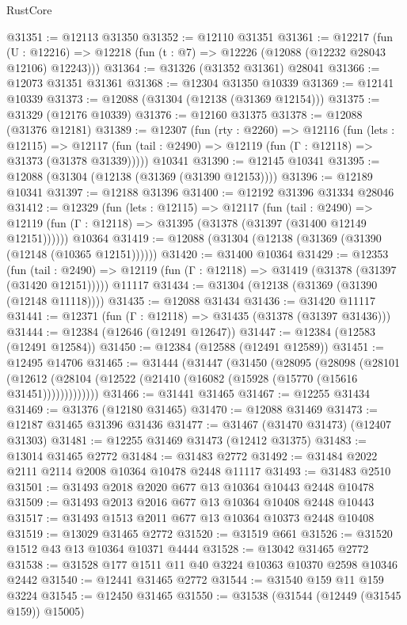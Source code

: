 \begin{lexlean}{RustCore}
\begin{coremodule}
@31351 := @12113 @31350
@31352 := @12110 @31351
@31361 := @12217
    (fun (U : @12216) => @12218 (fun (t : @7) => @12226 (@12088 (@12232 @28043 @12106) @12243)))
@31364 := @31326 (@31352 @31361) @28041
@31366 := @12073 @31351 @31361
@31368 := @12304 @31350 @10339
@31369 := @12141 @10339
@31373 := @12088 (@31304 (@12138 (@31369 @12154)))
@31375 := @31329 (@12176 @10339)
@31376 := @12160 @31375
@31378 := @12088 (@31376 @12181)
@31389 := @12307
    (fun (rty : @2260) =>
    @12116
      (fun (lets : @12115) =>
      @12117 (fun (tail : @2490) => @12119 (fun (Γ : @12118) => @31373 (@31378 @31339)))))
    @10341
@31390 := @12145 @10341
@31395 := @12088 (@31304 (@12138 (@31369 (@31390 @12153))))
@31396 := @12189 @10341
@31397 := @12188 @31396
@31400 := @12192 @31396 @31334 @28046
@31412 := @12329
    (fun (lets : @12115) =>
    @12117
      (fun (tail : @2490) =>
      @12119 (fun (Γ : @12118) => @31395 (@31378 (@31397 (@31400 @12149 @12151))))))
    @10364
@31419 := @12088 (@31304 (@12138 (@31369 (@31390 (@12148 (@10365 @12151))))))
@31420 := @31400 @10364
@31429 := @12353
    (fun (tail : @2490) => @12119 (fun (Γ : @12118) => @31419 (@31378 (@31397 (@31420 @12151)))))
    @11117
@31434 := @31304 (@12138 (@31369 (@31390 (@12148 @11118))))
@31435 := @12088 @31434
@31436 := @31420 @11117
@31441 := @12371 (fun (Γ : @12118) => @31435 (@31378 (@31397 @31436)))
@31444 := @12384 (@12646 (@12491 @12647))
@31447 := @12384 (@12583 (@12491 @12584))
@31450 := @12384 (@12588 (@12491 @12589))
@31451 := @12495 @14706
@31465 := @31444
    (@31447
      (@31450
        (@28095
          (@28098
            (@28101
              (@12612 (@28104 (@12522 (@21410 (@16082 (@15928 (@15770 (@15616 @31451)))))))))))))
@31466 := @31441 @31465
@31467 := @12255 @31434
@31469 := @31376 (@12180 @31465)
@31470 := @12088 @31469
@31473 := @12187 @31465 @31396 @31436
@31477 := @31467 (@31470 @31473) (@12407 @31303)
@31481 := @12255 @31469 @31473 (@12412 @31375)
@31483 := @13014 @31465 @2772
@31484 := @31483 @2772
@31492 := @31484 @2022 @2111 @2114 @2008 @10364 @10478 @2448 @11117
@31493 := @31483 @2510
@31501 := @31493 @2018 @2020 @677 @13 @10364 @10443 @2448 @10478
@31509 := @31493 @2013 @2016 @677 @13 @10364 @10408 @2448 @10443
@31517 := @31493 @1513 @2011 @677 @13 @10364 @10373 @2448 @10408
@31519 := @13029 @31465 @2772
@31520 := @31519 @661
@31526 := @31520 @1512 @43 @13 @10364 @10371 @4444
@31528 := @13042 @31465 @2772
@31538 := @31528 @177 @1511 @11 @40 @3224 @10363 @10370 @2598 @10346 @2442
@31540 := @12441 @31465 @2772
@31544 := @31540 @159 @11 @159 @3224
@31545 := @12450 @31465
@31550 := @31538 (@31544 (@12449 (@31545 @159)) @15005)

\end{coremodule}
\end{lexlean}

